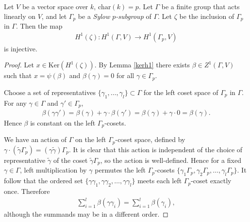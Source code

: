 \begin{lemma} \label{brown}
Let $V$ be a vector space over $k$, $\mathrm{char}(k) = p$. Let $\Gamma$ be a finite group that acts linearly on $V$, and let $\Gamma_p$ be a \emph{Sylow $p$-subgroup} of $\Gamma$. Let $\zeta$ be the inclusion of $\Gamma_p$ in $\Gamma$. Then the map 
\begin{align*}
H^1(\zeta):H^1(\Gamma, V)\rightarrow H^1(\Gamma_p, V)
\end{align*}
is injective.
\end{lemma}
\begin{proof}
	Let $x\in \mathrm{Ker}\left(H^1(\zeta)\right)$. By Lemma \ref{kerh1} there exists $\beta \in Z^1(\Gamma, V)$ such that $x = \psi(\beta)$ and $\beta(\gamma) = 0$ for all $\gamma \in \Gamma_p$.
	
	Choose a set of representatives $\{\gamma_1, \ldots, \gamma_l\} \subset \Gamma$ for the left coset space of $\Gamma_p$ in $\Gamma$.
	For any $\gamma \in \Gamma$ and $\gamma' \in \Gamma_p$,
\begin{align*}
	\beta(\gamma \gamma') = \beta(\gamma) + \gamma \cdot \beta(\gamma') = \beta(\gamma) +\gamma \cdot 0 = \beta(\gamma).
\end{align*} 
Hence $\beta$ is constant on the left $\Gamma_p$-cosets.

We have an action of $\Gamma$ on the left $\Gamma_p$-coset space, defined by $\gamma \cdot (\widetilde{\gamma}\Gamma_p) = (\gamma\widetilde{\gamma})\Gamma_p$. It is clear that this action is independent of the choice of representative $\widetilde{\gamma}$ of the coset $\widetilde{\gamma}\Gamma_p$, so the action is well-defined. Hence for a fixed $\gamma \in \Gamma$, left multiplication by $\gamma$ permutes the left $\Gamma_p$-cosets $\{\gamma_1\Gamma_p, \gamma_2\Gamma_p, \ldots, \gamma_l\Gamma_p\}$. It follow that the ordered set $\{\gamma\gamma_1, \gamma\gamma_2, \ldots, \gamma\gamma_l\}$ meets each left $\Gamma_p$-coset exactly once. Therefore
\begin{align}\label{betaconst}
	\sum_{i=1}^l \beta(\gamma\gamma_i) = \sum_{i=1}^l \beta(\gamma_i),
\end{align}
although the summands may be in a different order.


\end{proof}

